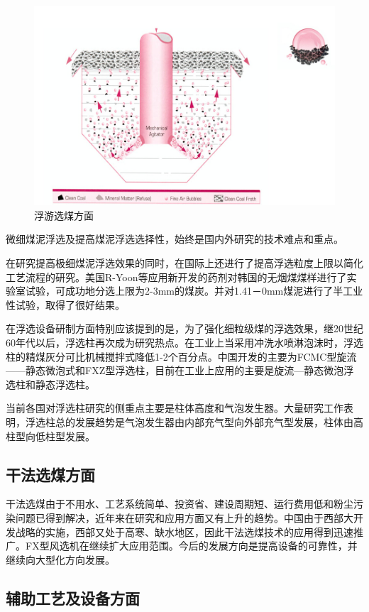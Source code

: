 \documentclass[10pt,openany]{ctexbook}
\begin{document}
   \begin{figure}[!ht]
\includegraphics[scale=0.6]{23}
\caption{浮游选煤方面}
\end{figure}
微细煤泥浮选及提高煤泥浮选选择性，始终是国内外研究的技术难点和重点。\par
    在研究提高极细煤泥浮选效果的同时，在国际上还进行了提高浮选粒度上限以简化工艺流程的研究。美国R-Yoon等应用新开发的药剂对韩国的无烟煤煤样进行了实验室试验，可成功地分选上限为2-3mm的煤炭。并对1.41－0mm煤泥进行了半工业性试验，取得了很好结果。 \par
 在浮选设备研制方面特别应该提到的是，为了强化细粒级煤的浮选效果，继20世纪60年代以后，浮选柱再次成为研究热点。在工业上当采用冲洗水喷淋泡沫时，浮选柱的精煤灰分可比机械搅拌式降低1-2个百分点。中国开发的主要为FCMC型旋流——静态微泡式和FXZ型浮选柱，目前在工业上应用的主要是旋流—静态微泡浮选柱和静态浮选柱。 \par
    当前各国对浮选柱研究的侧重点主要是柱体高度和气泡发生器。大量研究工作表明，浮选柱总的发展趋势是气泡发生器由内部充气型向外部充气型发展，柱体由高柱型向低柱型发展。
    \subsection{干法选煤方面}
干法选煤由于不用水、工艺系统简单、投资省、建设周期短、运行费用低和粉尘污染问题已得到解决，近年来在研究和应用方面又有上升的趋势。中国由于西部大开发战略的实施，西部又处于高寒、缺水地区，因此干法选煤技术的应用得到迅速推广。FX型风选机在继续扩大应用范围。今后的发展方向是提高设备的可靠性，并继续向大型化方向发展。
    \subsection{辅助工艺及设备方面}
\end{document}
